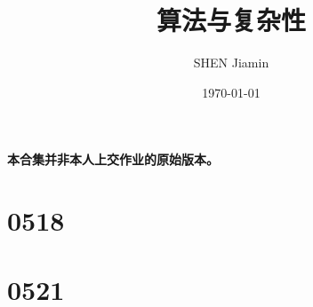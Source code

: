 \documentclass[answers]{exam}
\title{算法与复杂性}
\author{SHEN Jiamin}
\date{\today}
\begin{document}
\maketitle

\textbf{本合集并非本人上交作业的原始版本。}

\tableofcontents

\newpage














\section{0518}
\section{0521}
\end{document}
